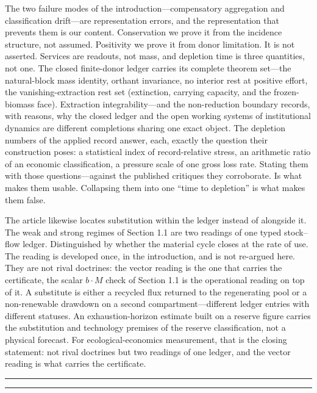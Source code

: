 \documentclass[11pt]{article}
\begin{document}
The two failure modes of the introduction---compensatory aggregation and classification drift---are representation errors, and the representation that prevents them is our content. Conservation we prove it from the incidence structure, not assumed. Positivity we prove it from donor limitation. It is not asserted. Services are readouts, not mass, and depletion time is three quantities, not one. The closed finite-donor ledger carries its complete theorem set---the natural-block mass identity, orthant invariance, no interior rest at positive effort, the vanishing-extraction rest set (extinction, carrying capacity, and the frozen-biomass face). Extraction integrability---and the non-reduction boundary records, with reasons, why the closed ledger and the open working systems of institutional dynamics are different completions sharing one exact object. The depletion numbers of the applied record answer, each, exactly the question their construction poses: a statistical index of record-relative stress, an arithmetic ratio of an economic classification, a pressure scale of one gross loss rate. Stating them with those questions---against the published critiques they corroborate. Is what makes them usable. Collapsing them into one ``time to depletion'' is what makes them false.

The article likewise locates substitution within the ledger instead of alongside it. The weak and strong regimes of Section 1.1 are two readings of one typed stock--flow ledger. Distinguished by whether the material cycle closes at the rate of use. The reading is developed once, in the introduction, and is not re-argued here. They are not rival doctrines: the vector reading is the one that carries the certificate, the scalar \(b\cdot M\) check of Section 1.1 is the operational reading on top of it. A substitute is either a recycled flux returned to the regenerating pool or a non-renewable drawdown on a second compartment---different ledger entries with different statuses. An exhaustion-horizon estimate built on a reserve figure carries the substitution and technology premises of the reserve classification, not a physical forecast. For ecological-economics measurement, that is the closing statement: not rival doctrines but two readings of one ledger, and the vector reading is what carries the certificate.

\begin{center}\rule{0.5\linewidth}{0.5pt}\end{center}

\begin{center}\rule{0.5\linewidth}{0.5pt}\end{center}
\end{document}
